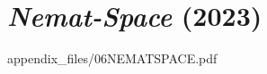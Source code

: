 
\chapter{\textit{Nemat-Space} (2023)}

        
            {appendix_files/06NEMATSPACE.pdf}
    

